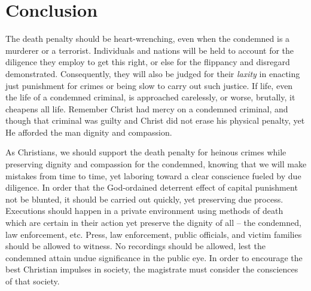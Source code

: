\ifdefined\embedversion\newpage\fi
\section{Conclusion}
The death penalty should be heart-wrenching, even when the condemned is a murderer or a terrorist.  Individuals and nations will be held to account for the diligence they employ to get this right, or else for the flippancy and disregard demonstrated.  Consequently, they will also be judged for their \textit{laxity} in enacting just punishment for crimes or being slow to carry out such justice.  If life, even the life of a condemned criminal, is approached carelessly, or worse, brutally, it cheapens all life.  Remember Christ had mercy on a condemned criminal, and though that criminal was guilty and Christ did not erase his physical penalty, yet He afforded the man dignity and compassion. 

As Christians, we should support the death penalty for heinous crimes while preserving dignity and compassion for the condemned, knowing that we will make mistakes from time to time, yet laboring toward a clear conscience fueled by due diligence.  In order that the God-ordained deterrent effect of capital punishment not be blunted, it should be carried out quickly, yet preserving due process.  Executions should happen in a private environment using methods of death which are certain in their action yet preserve the dignity of all -- the condemned, law enforcement, etc.  Press, law enforcement, public officials, and victim families should be allowed to witness.  No recordings should be allowed, lest the condemned attain undue significance in the public eye.  In order to encourage the best Christian impulses in society, the magistrate must consider the consciences of that society.


